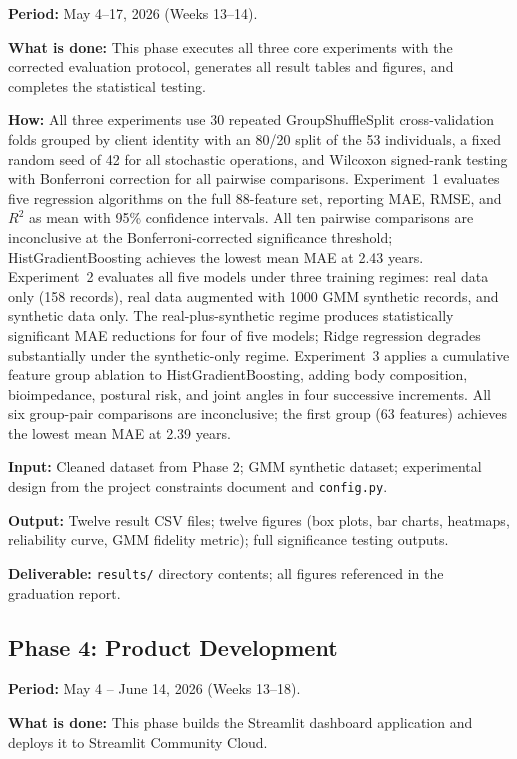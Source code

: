 \documentclass[11pt,a4paper]{article}
\begin{document}
\textbf{Period:} May 4--17, 2026 (Weeks 13--14).

\textbf{What is done:} This phase executes all three core experiments with the corrected evaluation protocol, generates all result tables and figures, and completes the statistical testing.

\textbf{How:} All three experiments use 30 repeated GroupShuffleSplit cross-validation folds grouped by client identity with an 80/20 split of the 53 individuals, a fixed random seed of 42 for all stochastic operations, and Wilcoxon signed-rank testing with Bonferroni correction for all pairwise comparisons. Experiment~1 evaluates five regression algorithms on the full 88-feature set, reporting MAE, RMSE, and $R^2$ as mean with 95\% confidence intervals. All ten pairwise comparisons are inconclusive at the Bonferroni-corrected significance threshold; HistGradientBoosting achieves the lowest mean MAE at 2.43 years. Experiment~2 evaluates all five models under three training regimes: real data only (158 records), real data augmented with 1000 GMM synthetic records, and synthetic data only. The real-plus-synthetic regime produces statistically significant MAE reductions for four of five models; Ridge regression degrades substantially under the synthetic-only regime. Experiment~3 applies a cumulative feature group ablation to HistGradientBoosting, adding body composition, bioimpedance, postural risk, and joint angles in four successive increments. All six group-pair comparisons are inconclusive; the first group (63 features) achieves the lowest mean MAE at 2.39 years.

\textbf{Input:} Cleaned dataset from Phase 2; GMM synthetic dataset; experimental design from the project constraints document and \texttt{config.py}.

\textbf{Output:} Twelve result CSV files; twelve figures (box plots, bar charts, heatmaps, reliability curve, GMM fidelity metric); full significance testing outputs.

\textbf{Deliverable:} \texttt{results/} directory contents; all figures referenced in the graduation report.

\subsection{Phase 4: Product Development}

\textbf{Period:} May 4 -- June 14, 2026 (Weeks 13--18).

\textbf{What is done:} This phase builds the Streamlit dashboard application and deploys it to Streamlit Community Cloud.
\end{document}
